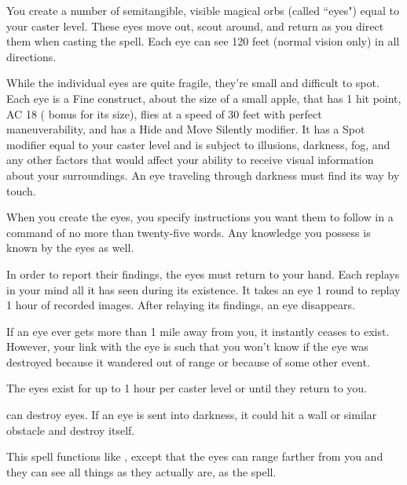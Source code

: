 \begin{spelleffect}
You create a number of semitangible, visible magical orbs (called ``eyes") equal to your caster level. These eyes move out, scout around, and return as you direct them when casting the spell. Each eye can see 120 feet (normal vision only) in all directions.
\par While the individual eyes are quite fragile, they're small and difficult to spot. Each eye is a Fine construct, about the size of a small apple, that has 1 hit point, AC 18 ( bonus for its size), flies at a speed of 30 feet with perfect maneuverability, and has a  Hide and Move Silently modifier. It has a Spot modifier equal to your caster level and is subject to illusions, darkness, fog, and any other factors that would affect your ability to receive visual information about your surroundings. An eye traveling through darkness must find its way by touch.
\par When you create the eyes, you specify instructions you want them to follow in a command of no more than twenty-five words. Any knowledge you possess is known by the eyes as well.
\par In order to report their findings, the eyes must return to your hand. Each replays in your mind all it has seen during its existence. It takes an eye 1 round to replay 1 hour of recorded images. After relaying its findings, an eye disappears.
\par If an eye ever gets more than 1 mile away from you, it instantly ceases to exist. However, your link with the eye is such that you won't know if the eye was destroyed because it wandered out of range or because of some other event.
\par The eyes exist for up to 1 hour per caster level or until they return to you.
\end{spelleffect}
\begin{spellnotes}
 can destroy eyes. If an eye is sent into darkness, it could hit a wall or similar obstacle and destroy itself.
\end{spellnotes}

\begin{spelleffect}
This spell functions like , except that the eyes can range farther from you and they can see all things as they actually are, as the  spell.
\end{spelleffect}

